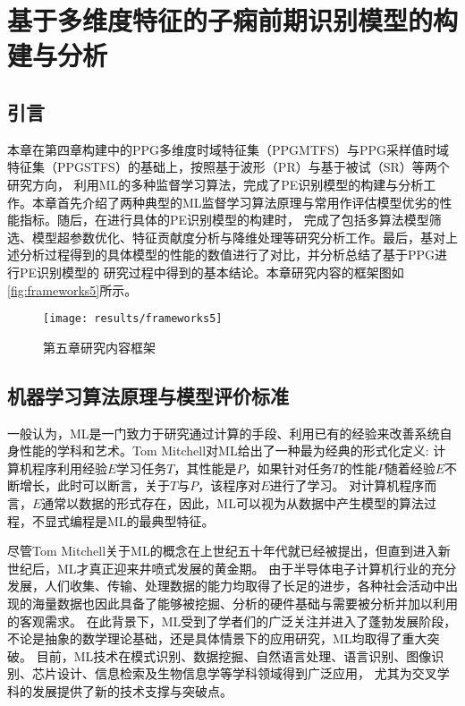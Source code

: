 \chapter{基于多维度特征的子痫前期识别模型的构建与分析}
\section{引言}
本章在第四章构建中的PPG多维度时域特征集（PPGMTFS）与PPG采样值时域特征集（PPGSTFS）的基础上，按照基于波形（PR）与基于被试（SR）等两个研究方向，
利用ML的多种监督学习算法，完成了PE识别模型的构建与分析工作。本章首先介绍了两种典型的ML监督学习算法原理与常用作评估模型优劣的性能指标。随后，在进行具体的PE识别模型的构建时，
完成了包括多算法模型筛选、模型超参数优化、特征贡献度分析与降维处理等研究分析工作。最后，基对上述分析过程得到的具体模型的性能的数值进行了对比，并分析总结了基于PPG进行PE识别模型的
研究过程中得到的基本结论。本章研究内容的框架图如\autoref{fig:frameworks5}所示。

\begin{figure}[htbp]
      \centering
      \texttt{[image: results/frameworks5]}
      \caption{\label{fig:frameworks5}第五章研究内容框架}
\end{figure}
\vspace{-0.8cm} 

\section{机器学习算法原理与模型评价标准}
一般认为，ML是一门致力于研究通过计算的手段、利用已有的经验来改善系统自身性能的学科和艺术\cite{Zhou2016,Aurélien2018}。Tom Mitchell对ML给出了一种最为经典的形式化定义:
计算机程序利用经验$E$学习任务$T$，其性能是$P$，如果针对任务$T$的性能$P$随着经验$E$不断增长，此时可以断言，关于$T$与$P$，该程序对$E$进行了学习\cite{mitchell1997,Zhou2016}。
对计算机程序而言，$E$通常以数据的形式存在，因此，ML可以视为从数据中产生模型的算法过程，不显式编程是ML的最典型特征。

尽管Tom Mitchell关于ML的概念在上世纪五十年代就已经被提出，但直到进入新世纪后，ML才真正迎来井喷式发展的黄金期。
由于半导体电子计算机行业的充分发展，人们收集、传输、处理数据的能力均取得了长足的进步，各种社会活动中出现的海量数据也因此具备了能够被挖掘、分析的硬件基础与需要被分析并加以利用的客观需求。
在此背景下，ML受到了学者们的广泛关注并进入了蓬勃发展阶段，不论是抽象的数学理论基础，还是具体情景下的应用研究，ML均取得了重大突破。
目前，ML技术在模式识别、数据挖掘、自然语言处理、语言识别、图像识别、芯片设计、信息检索及生物信息学等学科领域得到广泛应用，
尤其为交叉学科的发展提供了新的技术支撑与突破点\cite{Zhou2016,Aurélien2018,Li2017}。   

